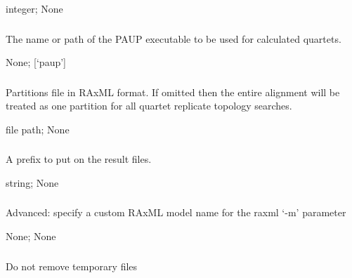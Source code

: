 \documentclass[letterpaper,12pt,english]{sphinxmanual}
\begin{document}
 integer;  None


\subsubsection{}
\label{\detokenize{prog_desc:paup-executable}}
 The name or path of the PAUP executable to be used for calculated quartets.

 None;  {[}‘paup’{]}


\subsubsection{}
\label{\detokenize{prog_desc:q-partitions}}
 Partitions file in RAxML format. If omitted then the entire alignment will be treated as one partition for all quartet replicate topology searches.

 file path;  None


\subsubsection{}
\label{\detokenize{prog_desc:r-result-prefix}}
 A prefix to put on the result files.

 string;  None


\subsubsection{}
\label{\detokenize{prog_desc:raxml-model}}
 Advanced: specify a custom RAxML model name for the raxml ‘-m’ parameter

 None;  None


\subsubsection{}
\label{\detokenize{prog_desc:retain-temp}}
 Do not remove temporary files
\end{document}
